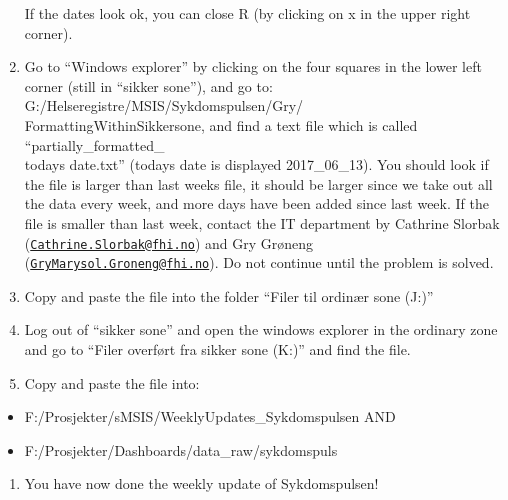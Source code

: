 \documentclass[12pt,]{article}
\providecommand{\tightlist}{%
  \setlength{\itemsep}{0pt}\setlength{\parskip}{0pt}}
\theoremstyle{definition}
\theoremstyle{definition}
\theoremstyle{definition}
\theoremstyle{remark}
\begin{document}
\begin{enumerate}
  If the dates look ok, you can close R (by clicking on x in the upper
  right corner).
\item
  Go to ``Windows explorer'' by clicking on the four squares in the
  lower left corner (still in ``sikker sone''), and go to:
  G:/Helseregistre/MSIS/Sykdomspulsen/Gry/\\
  FormattingWithinSikkersone, and find a text file which is called
  ``partially\_formatted\_\\
  todays date.txt'' (todays date is displayed 2017\_06\_13). You should
  look if the file is larger than last weeks file, it should be larger
  since we take out all the data every week, and more days have been
  added since last week. If the file is smaller than last week, contact
  the IT department by Cathrine Slorbak
  (\href{mailto:Cathrine.Slorbak@fhi.no}{\nolinkurl{Cathrine.Slorbak@fhi.no}})
  and Gry Grøneng
  (\href{mailto:GryMarysol.Groneng@fhi.no}{\nolinkurl{GryMarysol.Groneng@fhi.no}}).
  Do not continue until the problem is solved.
\item
  Copy and paste the file into the folder ``Filer til ordinær sone
  (J:)''
\item
  Log out of ``sikker sone'' and open the windows explorer in the
  ordinary zone and go to ``Filer overført fra sikker sone (K:)'' and
  find the file.
\item
  Copy and paste the file into:
\end{enumerate}

\begin{itemize}
\tightlist
\item
  F:/Prosjekter/sMSIS/WeeklyUpdates\_Sykdomspulsen AND
\item
  F:/Prosjekter/Dashboards/data\_raw/sykdomspuls
\end{itemize}

\begin{enumerate}
\def\labelenumi{\arabic{enumi}.}
\setcounter{enumi}{14}
\tightlist
\item
  You have now done the weekly update of Sykdomspulsen!
\end{enumerate}


\end{document}
